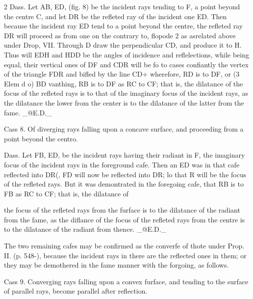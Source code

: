 \documentclass[10pt]{article}
\begin{document}
\begin{multicols}{2}
Dass. Let AB, ED, (fig. 8) be the incident rays tending to F, a point beyond the centre C, and let DR be the refleted ray of the incident one ED. Then because the incident ray ED tend to a point beyond the centre, the refleted ray DR will proceed as from one on the contrary to, flopode 2 as asrelated above under Drop, VII. Through D draw the perpendicular CD, and produce it to H. Thus will EDH and HDD be the angles of incidence and reflelections, while being equal, their vertical ones of DF and CDR will be fo to cases confiantly the vertex of the triangle FDR and bifled by the line CD+ wherefore, RD is to DF, or (3 Elem d o) BD vanthing, RB is to DF as RC to CF; that is, the dilatance of the focus of the refleted rays is to that of the imaginary focus of the incident rays, as the dilatance the lower from the center is to the dilatance of the latter from the fame. \_@E.D.\_

Cass 8. Of diverging rays falling upon a concave surface, and proceeding from a point beyond the centro.

Dass. Let FB, ED, be the incident rays having their radiant in F, the imaginary focus of the incident rays in the foreground cafe. Then an ED was in that cafe reflected into DR(, FD will now be reflected into DR; lo that R will be the focus of the refleted rays. But it was demontrated in the foregoing cafe, that RB is to FB as RC to CF; that is, the dilatance of

the focus of the refleted rays from the furface is to the dilatance of the radiant from the fame, as the diflance of the focus of the refleted rays from the centre is to the dilatance of the radiant from thence. \_@E.D.\_

The two remaining cafes may be confirmed as the converfe of thote under Prop. II. (p. 548-), because the incident rays in there are the reflected ones in them; or they may be demothered in the fame manner with the forgoing, as follows.

Cass 9. Converging rays falling upon a convex furface, and tending to the surface of parallel rays, become parallel after reflection.


\end{multicols}
\end{document}
